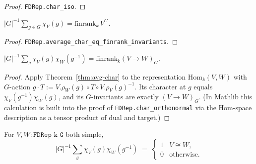\begin{proof}\leanok{}
  \texttt{FDRep.char\_iso}.
\end{proof}

\begin{theorem}
  \label{thm:avg-char}
  \mathlibok
  \leanok
  $|G|^{-1}\sum_{g \in G}\chi_V(g) = \mathrm{finrank}_k\,V^G$.
\end{theorem}

\begin{proof}\leanok{}
  \texttt{FDRep.average\_char\_eq\_finrank\_invariants}.
\end{proof}

\begin{theorem}
  \label{thm:hom-via-char}
  $|G|^{-1}\sum_{g}\chi_V(g)\chi_W(g^{-1}) = \mathrm{finrank}_k(V \to W)_G$.
\end{theorem}

\begin{proof}
  Apply Theorem~\ref{thm:avg-char} to the representation $\mathrm{Hom}_k(V, W)$
  with $G$-action $g \cdot T := V.\rho_W(g) \circ T \circ V.\rho_V(g)^{-1}$.
  Its character at $g$ equals $\chi_V(g^{-1})\chi_W(g)$, and its
  $G$-invariants are exactly $(V \to W)_G$. (In Mathlib this calculation is
  built into the proof of \texttt{FDRep.char\_orthonormal} via the Hom-space
  description as a tensor product of dual and target.)
\end{proof}

\begin{theorem}
  \label{thm:char-ortho}
  \mathlibok
  \leanok
  For $V, W : \texttt{FDRep k G}$ both simple,
  \[
     |G|^{-1}\sum_g \chi_V(g)\chi_W(g^{-1})
     \;=\; \begin{cases} 1 & V \cong W,\\ 0 & \text{otherwise.}\end{cases}
  \]
\end{theorem}


